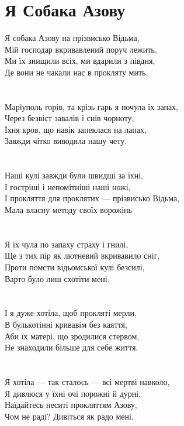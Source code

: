 \section{Я Собака Азову}

Я собака Азову на прізвисько Відьма,\\
Мій господар вкривавлений поруч лежить,\\
Ми їх знищили всіх, ми вдарили з півдня,\\
Де вони не чакали нас в прокляту мить.\\
\\
\\
Маріуполь горів, та крізь гарь я почула їх запах,\\
Через безвіст завалів і снів чорноту,\\
Їхня кров, що навік запеклася на лапах,\\
Завжди чітко виводила нашу чету.\\
\\
\\
Наші кулі завжди були швидші за їхні,\\
І гостріші і непомітніші наші ножі,\\
І прокляття для проклятих — прізвисько Відьма,\\
Мала власну методу своїх ворожінь\\
\\
\\
Я їх чула по запаху страху і гнилі,\\
Ще з тих пір як лютневий вкривавило сніг,\\
Проти помсти відьомської кулі безсилі,\\
Варто було лиш схотіти мені.\\
\\
\\
І я дуже хотіла, щоб прокляті мерли,\\
В булькотінні кривавім без каяття,\\
Аби їх матері, що зродилися стервом,\\
Не знаходили більше для себе життя.\\
\\
\\
Я хотіла — так сталось — всі мертві навколо,\\
Я дивлюся у їхні очі порожні й дурні,\\
Наїдайтесь неситі прокляттям Азову,\\
Чом не раді? Дивіться як радо мені.\\
\\
